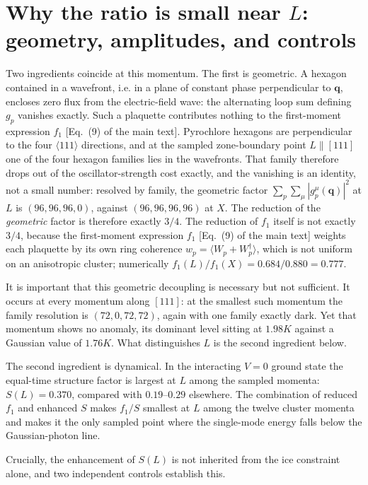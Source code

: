 \documentclass[aps,prl,twocolumn,amsmath,amssymb,superscriptaddress,
longbibliography,floatfix]{revtex4-2}
\newcommand{\bq}{\bm q}
\begin{document}
\section{Why the ratio is small near $L$: geometry, amplitudes, and controls}
\label{sm:whyL}

Two ingredients coincide at
this momentum. The first is geometric. A hexagon contained in a
wavefront, i.e. in a plane of constant phase perpendicular to $\bq$,
encloses zero flux from the electric-field wave: the alternating loop
sum defining $g_p$ vanishes exactly. Such a plaquette contributes
nothing to the first-moment expression $f_1$ [Eq.~(9) of the main text]. Pyrochlore hexagons are perpendicular
to the four $\langle111\rangle$ directions, and at the sampled
zone-boundary point $L\parallel[111]$ one of the four hexagon families
lies in the wavefronts. That family therefore drops out of the
oscillator-strength cost exactly, and the vanishing is an identity, not
a small number: resolved by family, the geometric factor
$\sum_p\sum_\mu|g^\mu_p(\bq)|^2$ at $L$ is $(96,96,96,0)$, against
$(96,96,96,96)$ at $X$. The reduction of the \emph{geometric} factor
is therefore exactly $3/4$. The reduction of $f_1$ itself is not
exactly $3/4$, because the first-moment expression $f_1$ [Eq.~(9) of the main text] weights each plaquette by its
own ring coherence $w_p=\langle W_p+W_p^\dagger\rangle$, which is not
uniform on an anisotropic cluster; numerically
$f_1(L)/f_1(X)=0.684/0.880=0.777$.

It is important that this geometric decoupling is necessary but not
sufficient. It occurs at every momentum along $[111]$: at the smallest
such momentum the family resolution is $(72,0,72,72)$, again with one
family exactly dark. Yet that momentum shows no anomaly, its dominant
level sitting at $1.98K$ against a Gaussian value of $1.76K$. What
distinguishes $L$ is the second ingredient below.

The second ingredient is dynamical. In the interacting $V=0$ ground
state the equal-time structure factor is largest at $L$ among the
sampled momenta: $S(L)=0.370$, compared with $0.19$--$0.29$ elsewhere.
The combination of reduced $f_1$ and enhanced $S$ makes
$f_1/S$ smallest at $L$ among the twelve cluster momenta and makes it
the only sampled point where the single-mode energy falls below the
Gaussian-photon line.

Crucially, the enhancement of $S(L)$ is not inherited from the ice
constraint alone, and two independent controls establish this.
\end{document}
